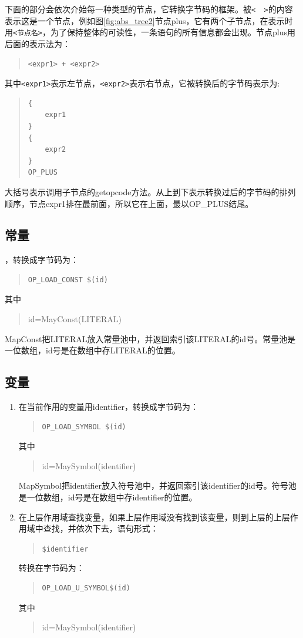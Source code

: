 下面的部分会依次介始每一种类型的节点，它转换字节码的框架。被\verb|<  >|的内容表示这是一个节点，例如图\ref{fig:abs_tree2}节点plus，它有两个子节点，在表示时用\verb|<节点名>|，为了保持整体的可读性，一条语句的所有信息都会出现。节点plus用后面的表示法为：
\begin{quote}
\begin{verbatim}
<expr1> + <expr2> 
\end{verbatim}
\end{quote}
其中\verb|<expr1>|表示左节点，\verb|<expr2>|表示右节点，它被转换后的字节码表示为:
\begin{quote}
\begin{verbatim}
{
    expr1
}
{
    expr2
}
OP_PLUS
\end{verbatim}
\end{quote}
大括号表示调用子节点的getopcode方法。从上到下表示转换过后的字节码的排列顺序，节点expr1排在最前面，所以它在上面，最以OP\_PLUS结尾。

\subsection{常量}
，转换成字节码为：
\begin{quote}
\begin{verbatim}
OP_LOAD_CONST $(id)
\end{verbatim}
\end{quote}
其中
\begin{quote}
id=MayConst(LITERAL)
\end{quote}
MapConst把LITERAL放入常量池中，并返回索引该LITERAL的id号。常量池是一位数组，id号是在数组中存LITERAL的位置。

\subsection{变量}
\begin{enumerate}
\item 在当前作用的变量用identifier，转换成字节码为：
\begin{quote}
\begin{verbatim}
OP_LOAD_SYMBOL $(id)
\end{verbatim}
\end{quote}
其中
\begin{quote}
id=MaySymbol(identifier)
\end{quote}
MapSymbol把identifier放入符号池中，并返回索引该identifier的id号。符号池是一位数组，id号是在数组中存identifier的位置。

\item 在上层作用域查找变量，如果上层作用域没有找到该变量，则到上层的上层作用域中查找，并依次下去，语句形式：
\begin{quote}
\verb|$identifier|
\end{quote}
转换在字节码为：
\begin{quote}
\begin{verbatim}
OP_LOAD_U_SYMBOL$(id)
\end{verbatim}
\end{quote}
其中
\begin{quote}
id=MaySymbol(identifier)
\end{quote}
\end{enumerate}

